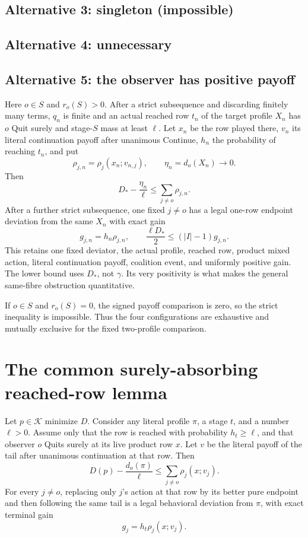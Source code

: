 \documentclass[11pt]{article}
\newcommand{\K}{\mathcal K}
\begin{document}
\subsection{Alternative 3: singleton (impossible)}
\label{alt:singleton}
\subsection{Alternative 4: unnecessary}
\label{alt:negative-target}

\subsection{Alternative 5: the observer has positive payoff}
\label{alt:positive-target}

Here $o\in S$ and $r_o(S)>0$.  After a strict subsequence and
discarding finitely many terms, $q_n$ is finite and an actual reached row
$t_n$ of the target profile $X_n$ has $o$ Quit surely and stage-$S$ mass at
least $\ell$.  Let $x_n$ be the row played there, $v_n$ its literal
continuation payoff after unanimous Continue, $h_n$ the probability of
reaching $t_n$, and put
\[
 \rho_{j,n}=\rho_j(x_n;v_{n,j}),\qquad \eta_n=d_o(X_n)\longrightarrow0.
\]
Then
\[
 D_*-\frac{\eta_n}{\ell}\le\sum_{j\ne o}\rho_{j,n}.
\]
After a further strict subsequence, one fixed $j\ne o$ has a legal one-row
endpoint deviation from the same $X_n$ with exact gain
\[
 g_{j,n}=h_n\rho_{j,n},
 \qquad
 \frac{\ell D_*}{2}\le(|I|-1)g_{j,n}.
\]
This retains one fixed deviator, the actual profile, reached row, product
mixed action, literal continuation payoff, coalition event, and uniformly
positive gain.  The lower bound uses $D_*$, not $\gamma$.  Its very
positivity is what makes the general same-fibre obstruction quantitative.

If $o\in S$ and $r_o(S)=0$, the signed payoff comparison is zero,
so the strict inequality is impossible.  Thus the four
configurations are exhaustive and mutually exclusive for the fixed
two-profile comparison.

\section{The common surely-absorbing reached-row lemma}
\label{sec:reached-row}

Let $p\in\K$ minimize $D$.  Consider any literal profile $\pi$, a stage $t$,
and a number $\ell>0$.  Assume only that the row is reached with probability
$h_t\ge\ell$, and that observer $o$ Quits surely at its live product row
$x$.  Let $v$ be the literal payoff of the tail after unanimous continuation
at that row.  Then
\begin{equation}
\label{eq:reached-row}
 \boxed{
 D(p)-\frac{d_o(\pi)}{\ell}
 \le\sum_{j\ne o}\rho_j(x;v_j).}
\end{equation}
For every $j\ne o$, replacing only $j$'s action at that row by its better pure
endpoint and then following the same tail is a legal behavioral deviation
from $\pi$, with exact terminal gain
\[
 g_j=h_t\rho_j(x;v_j).
\]
\end{document}
